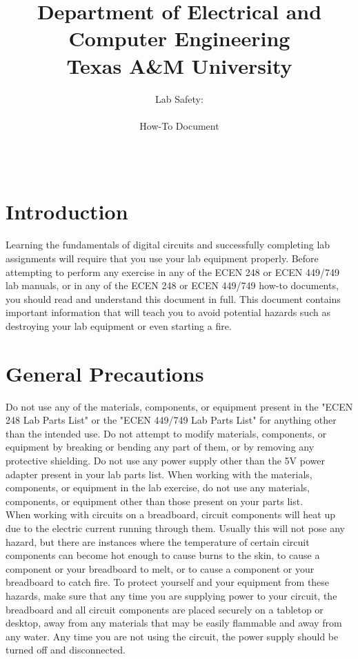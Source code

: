 \documentclass[11pt,twoside,titlepage]{article}
\title{ \huge Department of Electrical and Computer Engineering\\ \huge Texas A\&M University \\}
\author{ \huge Lab Safety:\\ \\ \huge How-To Document \\ \\ \\ \ta}
\date{}
\begin{document}

\maketitle

\section{Introduction}
Learning the fundamentals of digital circuits and successfully completing lab assignments will require that you use your lab equipment properly. Before attempting to perform any exercise in any of the ECEN 248 or ECEN 449/749 lab manuals, or in any of the ECEN 248 or ECEN 449/749 how-to documents, you should read and understand this document in full. This document contains important information that will teach you to avoid potential hazards such as destroying your lab equipment or even starting a fire.\\

\section{General Precautions}

\noindent
Do not use any of the materials, components, or equipment present in the "ECEN 248 Lab Parts List" or the "ECEN 449/749 Lab Parts List" for anything other than the intended use. Do not attempt to modify materials, components, or equipment by breaking or bending any part of them, or by removing any protective shielding. Do not use any power supply other than the 5V power adapter present in your lab parts list. When working with the materials, components, or equipment in the lab exercise, do not use any materials, components, or equipment other than those present on your parts list.\\

\noindent
When working with circuits on a breadboard, circuit components will heat up due to the electric current running through them. Usually this will not pose any hazard, but there are instances where the temperature of certain circuit components can become hot enough to cause burns to the skin, to cause a component or your breadboard to melt, or to cause a component or your breadboard to catch fire. To protect yourself and your equipment from these hazards, make sure that any time you are supplying power to your circuit, the breadboard and all circuit components are placed securely on a tabletop or desktop, away from any materials that may be easily flammable and away from any water. Any time you are not using the circuit, the power supply should be turned off and disconnected.\\
\end{document}

